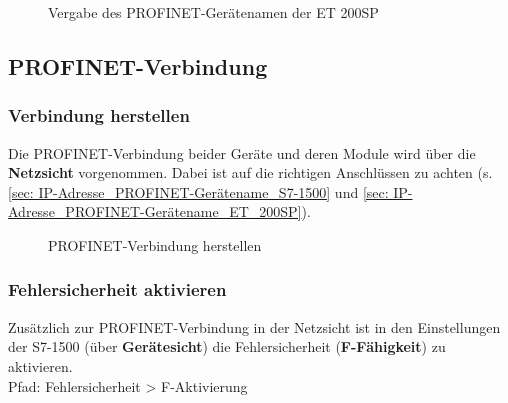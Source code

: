 \begin{figure}[H]
   \centering
   \caption[Vergabe des PROFINET-Gerätenamen der ET 200SP]{Vergabe des PROFINET-Gerätenamen der ET 200SP}
   \label{fig:Bild6.29}
\end{figure}

\clearpage

\subsection{PROFINET-Verbindung} \label{sec:ergebnisse}

\subsubsection{Verbindung herstellen} \label{sec: Verbindung herstellen}
Die PROFINET-Verbindung beider Geräte und deren Module wird über die \textbf{Netzsicht} vorgenommen. Dabei ist auf die richtigen Anschlüssen zu achten (s. \autoref{sec: IP-Adresse_PROFINET-Gerätename_S7-1500} und \autoref{sec: IP-Adresse_PROFINET-Gerätename_ET_200SP}).

\begin{figure}[H]
   \centering
   \caption[PROFINET-Verbindung herstellen]{PROFINET-Verbindung herstellen}
   \label{fig:Bild6.30}
\end{figure}

\subsubsection{Fehlersicherheit aktivieren}
Zusätzlich zur PROFINET-Verbindung in der Netzsicht ist in den Einstellungen der S7-1500 (über \textbf{Gerätesicht}) die Fehlersicherheit (\textbf{F-Fähigkeit}) zu aktivieren.\\
Pfad: Fehlersicherheit > F-Aktivierung

